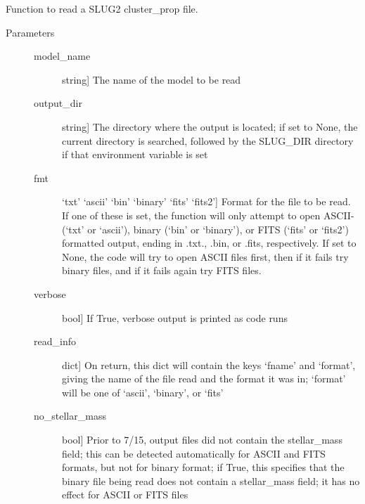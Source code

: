 \documentclass[letterpaper,10pt,english]{sphinxmanual}
\begin{document}

\begin{fulllineitems}
\label{\detokenize{slugpy:slugpy.read_cluster_prop}}
Function to read a SLUG2 cluster\_prop file.
\begin{description}
\item[{Parameters}] \leavevmode\begin{description}
\item[{model\_name}] \leavevmode{[}string{]}
The name of the model to be read

\item[{output\_dir}] \leavevmode{[}string{]}
The directory where the output is located; if set to None,
the current directory is searched, followed by the SLUG\_DIR
directory if that environment variable is set

\item[{fmt}] \leavevmode{[}‘txt’ \textbar{} ‘ascii’ \textbar{} ‘bin’ \textbar{} ‘binary’ \textbar{} ‘fits’ \textbar{} ‘fits2’{]}
Format for the file to be read. If one of these is set, the
function will only attempt to open ASCII-(‘txt’ or ‘ascii’), 
binary (‘bin’ or ‘binary’), or FITS (‘fits’ or ‘fits2’)
formatted output, ending in .txt., .bin, or .fits,
respectively. If set to None, the code will try to open
ASCII files first, then if it fails try binary files, and if
it fails again try FITS files.

\item[{verbose}] \leavevmode{[}bool{]}
If True, verbose output is printed as code runs

\item[{read\_info}] \leavevmode{[}dict{]}
On return, this dict will contain the keys ‘fname’ and
‘format’, giving the name of the file read and the format it
was in; ‘format’ will be one of ‘ascii’, ‘binary’, or ‘fits’

\item[{no\_stellar\_mass}] \leavevmode{[}bool{]}
Prior to 7/15, output files did not contain the stellar\_mass
field; this can be detected automatically for ASCII and FITS
formats, but not for binary format; if True, this specifies
that the binary file being read does not contain a
stellar\_mass field; it has no effect for ASCII or FITS files


\end{description}
\end{description}
\end{fulllineitems}
\end{document}

